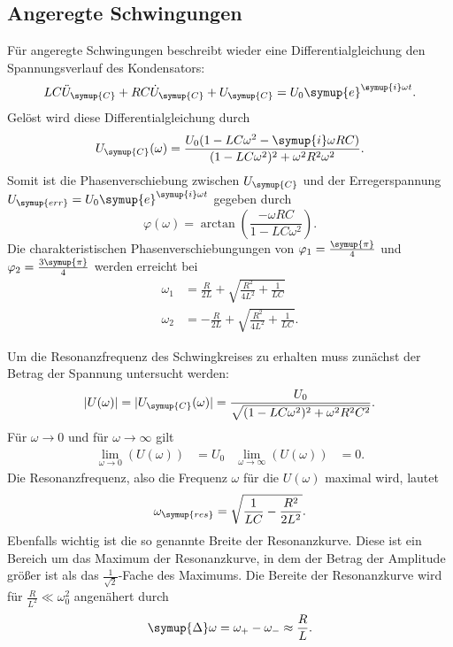 \subsection{Angeregte Schwingungen}
Für angeregte Schwingungen beschreibt wieder eine Differentialgleichung den Spannungsverlauf des Kondensators:
\begin{equation*}
    LC\ddot{U}_{\symup{C}}+RC\dot{U}_{\symup{C}}+U_{\symup{C}} = U_0\symup{e}^{\symup{i}\omega t}.
\end{equation*}
Gelöst wird diese Differentialgleichung durch
\begin{equation*}
    U_{\symup{C}}(\omega)=\frac{U_0(1-LC\omega^2-\symup{i}\omega RC)}{(1-LC\omega^2)^{2}+\omega^2R^2\omega^2}.
\end{equation*}
Somit ist die Phasenverschiebung zwischen $U_{\symup{C}}$ und der Erregerspannung~$U_{\symup{err}}=U_0\symup{e}^{\symup{i}\omega t}$
gegeben durch
\begin{equation}
    \varphi(\omega)=\arctan\left(\frac{-\omega RC}{1-LC\omega^2}\right).
    \label{eq:Phasenverschiebung}
\end{equation}
Die charakteristischen Phasenverschiebungungen von $\varphi_1 = \frac{\symup{\pi}}{4}$ und $\varphi_2 = \frac{3\symup{\pi}}{4}$ werden erreicht bei
\begin{align}
    \omega_1&=\frac{R}{2L}+\sqrt{\frac{R^2}{4L^2}+\frac{1}{LC}} \label{eq:omega 1} \\
    \omega_2&=-\frac{R}{2L}+\sqrt{\frac{R^2}{4L^2}+\frac{1}{LC}}. \label{eq:omega 2}
\end{align}

Um die Resonanzfrequenz des Schwingkreises zu erhalten muss zunächst der Betrag der Spannung untersucht werden:
\begin{equation*}
    |U(\omega)|=|U_{\symup{C}}(\omega)| = \frac{U_0}{\sqrt{(1-LC\omega^2)^2+\omega^2R^2C^2}}.
\end{equation*}
Für $\omega \to 0$ und für $\omega \to \infty$ gilt
\begin{align*}
    \lim \limits_{\omega \to 0} (U(\omega)) &= U_0 & \lim \limits_{\omega \to \infty} (U(\omega)) &= 0.
\end{align*}
Die Resonanzfrequenz, also die Frequenz $\omega$ für die $U(\omega)$ maximal wird, lautet
\begin{equation}
    \omega_{\symup{res}} = \sqrt{\frac{1}{LC}-\frac{R^2}{2L^2}}.
    \label{eq:Resonanzfrequenz}
\end{equation}
Ebenfalls wichtig ist die so genannte Breite der Resonanzkurve. Diese ist ein Bereich um das Maximum der Resonanzkurve,
in dem der Betrag der Amplitude größer ist als das $\frac{1}{\sqrt{2}}$-Fache des Maximums. Die Bereite der Resonanzkurve
wird für $\frac{R}{L^2} \ll \omega_0^2$ angenähert durch
\begin{equation}
    \symup{\Delta}\omega = \omega_{+}-\omega_{-} \approx \frac{R}{L}.
    \label{eq:Breite Resonanzkurve}
\end{equation}
